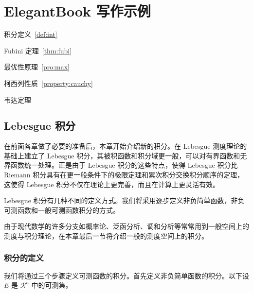 \documentclass[lang=cn,10pt]{elegantbook}
\begin{document}
\chapter{ElegantBook 写作示例}

\begin{introduction}
  \item 积分定义~\ref{def:int}
  \item Fubini 定理~\ref{thm:fubi}
  \item 最优性原理~\ref{pro:max}
  \item 柯西列性质~\ref{property:cauchy}
  \item 韦达定理
\end{introduction}

\section{Lebesgue 积分}
在前面各章做了必要的准备后，本章开始介绍新的积分。在 Lebesgue 测度理论的基础上建立了 Lebesgue 积分，其被积函数和积分域更一般，可以对有界函数和无界函数统一处理。正是由于 Lebesgue 积分的这些特点，使得 Lebesgue 积分比 Riemann 积分具有在更一般条件下的极限定理和累次积分交换积分顺序的定理，这使得 Lebesgue 积分不仅在理论上更完善，而且在计算上更灵活有效。

Lebesgue 积分有几种不同的定义方式。我们将采用逐步定义非负简单函数，非负可测函数和一般可测函数积分的方式。

由于现代数学的许多分支如概率论、泛函分析、调和分析等常常用到一般空间上的测度与积分理论，在本章最后一节将介绍一般的测度空间上的积分。

\subsection{积分的定义}

我们将通过三个步骤定义可测函数的积分。首先定义非负简单函数的积分。以下设 $E$ 是 $\mathcal{R}^n$ 中的可测集。

\end{document}
